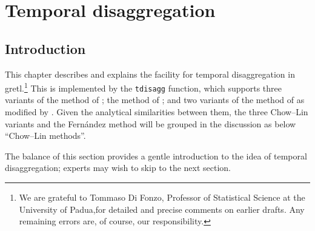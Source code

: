 \chapter{Temporal disaggregation}
\label{chap:tdisagg}

\newcommand{\Yb}{\mathbf{Y}}
\newcommand{\Xb}{\mathbf{X}}
\newcommand{\CXb}{\mathbf{CX}}
\newcommand{\Cb}{\mathbf{C}}
\newcommand{\Vb}{\mathbf{V}}
\newcommand{\Db}{\mathbf{D}}

\def\tditem[#1]#2{\item[{\tt #1}]#2}

\section{Introduction}
\label{sec:tdisagg-intro}

This chapter describes and explains the facility for temporal
disaggregation in gretl.\footnote{We are grateful to Tommaso Di Fonzo,
  Professor of Statistical Science at the University of Padua,for
  detailed and precise comments on earlier drafts. Any remaining
  errors are, of course, our responsibility.} This is implemented by
the \texttt{tdisagg} function, which supports three variants of the
method of \cite{chowlin71}; the method of \cite{fernandez81}; and two
variants of the method of \cite{denton71} as modified by
\cite{cholette84}. Given the analytical similarities between them, the
three Chow--Lin variants and the Fern\'andez method will be grouped in
the discussion as below ``Chow--Lin methods''.

The balance of this section provides a gentle introduction to the idea
of temporal disaggregation; experts may wish to skip to the next
section.


